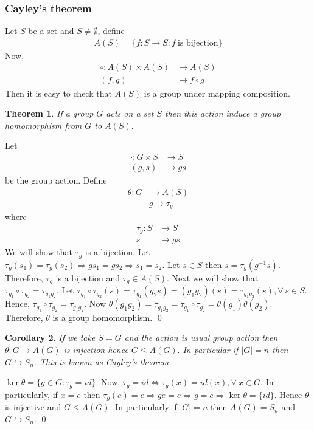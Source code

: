 \documentclass[11pt]{amsart}
\newtheorem{theorem}{Theorem}[section]
\newtheorem{corollary}[theorem]{Corollary}%
\begin{document}
\subsubsection{Cayley's theorem}
 Let $S$ be a set and $S\neq \emptyset$, define \begin{align*}
A(S)=\{f:S\to S:f~\text{is bijection}\}
\end{align*}
Now, \begin{align*}
\circ: A(S)\times A(S)&\to A(S)\\
(f,g)&\mapsto f\circ g
\end{align*}
Then it is easy to check that $A(S)$ is a group under mapping composition.

\begin{theorem}
If a group $G$ acts on a set $S$ then this action induce a group homomorphism from $G$ to $A(S).$
\end{theorem}
\proof Let \begin{align*}
\cdot:G\times S&\to S\\
(g,s)&\to gs
\end{align*} be the group action.
Define \begin{align*}
\theta:G&\to A(S)\\
&g\mapsto \tau_g
\end{align*}
where \begin{align*}
\tau_g:S&\to S\\
s&\mapsto gs
\end{align*}
We will show that $\tau_g$ is a bijection. Let $\tau_g(s_1)=\tau_g(s_2) \Rightarrow gs_1=gs_2 \Rightarrow s_1=s_2.$ Let $s\in S$ then $s=\tau_g(g^{-1}s)$. Therefore, $\tau_g$ is a bijection and $\tau_g\in A(S).$ Next we will show that $\tau_{g_1}\circ \tau_{g_2}=\tau_{g_1g_2}.$ Let $\tau_{g_1}\circ \tau_{g_2}(s)=\tau_{g_1}(g_2s)=(g_1g_2)(s)=\tau_{g_1g_2}(s),\forall~s\in S.$ Hence, $\tau_{g_1}\circ \tau_{g_2}=\tau_{g_1g_2}.$ Now $\theta(g_1g_2)=\tau_{g_1g_2}=\tau_{g_1}\circ \tau_{g_2}=\theta(g_1)\theta(g_2).$ Therefore, $\theta$ is a group homomorphism. \qed
\begin{corollary}
If we take $S=G$ and the action is usual group action then $\theta:G\to A(G)$ is injection hence $G\leq A(G).$ In particular if $|G|=n$ then $G\hookrightarrow S_n.$ This is known as Cayley's theorem.
\end{corollary}
\proof $\ker \theta=\{g\in G:\tau_g=id\}.$ Now, $\tau_g=id \Leftrightarrow \tau_g(x)=id(x),\forall~x\in G.$ In particularly, if $x=e$ then $\tau_g(e)=e \Rightarrow ge=e \Rightarrow g=e \Rightarrow \ker \theta =\{id\}.$ Hence $\theta$ is injective and $G\leq A(G).$ In particularly if $|G|=n$ then $A(G)=S_n$ and $G\hookrightarrow S_n.$ \qed
\end{document}

